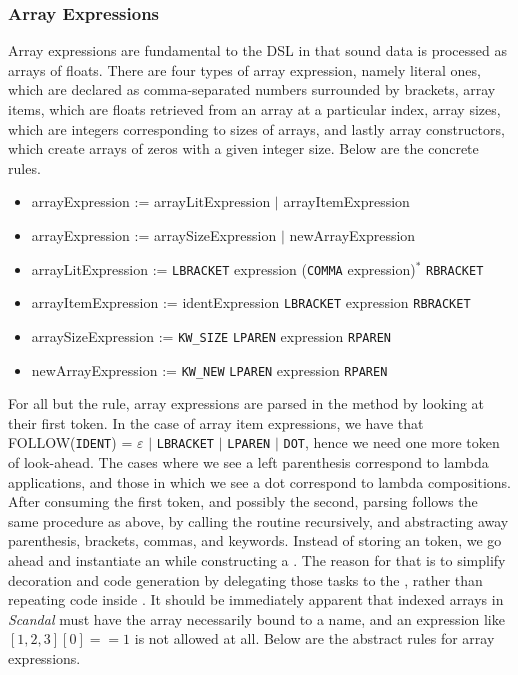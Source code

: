 \subsubsection{Array Expressions}

Array expressions are fundamental to the DSL in that sound data is processed as arrays of floats. There are four types of array expression, namely literal ones, which are declared as comma-separated numbers surrounded by brackets, array items, which are floats retrieved from an array at a particular index, array sizes, which are integers corresponding to sizes of arrays, and lastly array constructors, which create arrays of zeros with a given integer size. Below are the concrete rules.

\begin{itemize}
	\item arrayExpression := arrayLitExpression $|$ arrayItemExpression
	\item arrayExpression := arraySizeExpression $|$ newArrayExpression
	\item arrayLitExpression := \texttt{LBRACKET} expression (\texttt{COMMA} expression)$^*$ \texttt{RBRACKET}
	\item arrayItemExpression := identExpression \texttt{LBRACKET} expression \texttt{RBRACKET}
	\item arraySizeExpression := \texttt{KW\_SIZE} \texttt{LPAREN} expression \texttt{RPAREN}
	\item newArrayExpression := \texttt{KW\_NEW} \texttt{LPAREN} expression \texttt{RPAREN}
\end{itemize}

For all but the  rule, array expressions are parsed in the  method by looking at their first token. In the case of array item expressions, we have that FOLLOW(\texttt{IDENT}) = $\varepsilon$ $|$ \texttt{LBRACKET} $|$ \texttt{LPAREN} $|$ \texttt{DOT}, hence we need one more token of look-ahead. The cases where we see a left parenthesis correspond to lambda applications, and those in which we see a dot correspond to lambda compositions. After consuming the first token, and possibly the second, parsing follows the same procedure as above, by calling the  routine recursively, and abstracting away parenthesis, brackets, commas, and keywords. Instead of storing an  token, we go ahead and instantiate an  while constructing a . The reason for that is to simplify decoration and code generation by delegating those tasks to the , rather than repeating code inside . It should be immediately apparent that indexed arrays in \emph{Scandal} must have the array necessarily bound to a name, and an expression like $[1, 2, 3][0] == 1$ is not allowed at all. Below are the abstract rules for array expressions.

